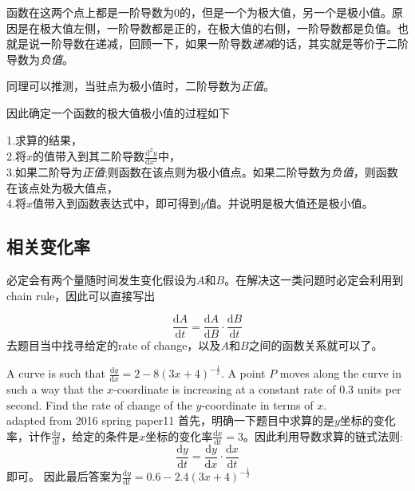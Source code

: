 函数在这两个点上都是一阶导数为$0$的，但是一个为极大值，另一个是极小值。原因是在极大值左侧，一阶导数都是正的，在极大值的右侧，一阶导数都是负值。也就是说一阶导数在递减，回顾一下，如果一阶导数\emph{递减}的话，其实就是等价于二阶导数为\emph{负值}。

同理可以推测，当驻点为极小值时，二阶导数为\emph{正值}。


因此确定一个函数的极大值极小值的过程如下
\begin{SummBox}
1.求算的结果，\\
2.将$x$的值带入到其二阶导数$\frac{\mathrm{d}^2 y}{\mathrm{d} x^2}$中，\\
3.如果二阶导为\emph{正值};则函数在该点则为极小值点。如果二阶导数为\emph{负值}，则函数在该点处为极大值点，\\
4.将$x$值带入到函数表达式中，即可得到$y$值。并说明是极大值还是极小值。
\end{SummBox}

\subsection*{相关变化率}
\label{subsec:Connected Rate of Change}

必定会有两个量随时间发生变化假设为$A$和$B$。在解决这一类问题时必定会利用到chain rule，因此可以直接写出

\[\frac{\mathrm{d} A}{\mathrm{d} t}=\frac{\mathrm{d} A}{\mathrm{d} B}\cdot \frac{\mathrm{d} B}{\mathrm{d} t}\]去题目当中找寻给定的rate of change，以及$A$和$B$之间的函数关系就可以了。

\begin{ExampleBox}
A curve is such that $\frac{\mathrm{d} y}{\mathrm{d} x}=2-8(3x+4)^{-\frac{1}{2}}$. A point $P$ moves along the curve in such a way that the $x$-coordinate is increasing at a constant rate of $0.3$ units per second. Find the rate of change of the $y$-coordinate in terms of $x$. \\
\makebox{}\hfill adapted from 2016 spring paper11
\tcblower
首先，明确一下题目中求算的是$y$坐标的变化率，计作$\frac{\mathrm{d} y}{\mathrm{d} t}$，给定的条件是$x$坐标的变化率$\frac{\mathrm{d} x}{\mathrm{d} t}=3$。因此利用导数求算的链式法则:
\[
	\frac{\mathrm{d} y}{\mathrm{d} t} = \frac{\mathrm{d} y}{\mathrm{d} x} \cdot \frac{\mathrm{d} x}{\mathrm{d} t}
\]
即可。
因此最后答案为$\frac{\mathrm{d} y}{\mathrm{d} t}=0.6-2.4(3x+4)^{-\frac{1}{2}}$
\end{ExampleBox}





